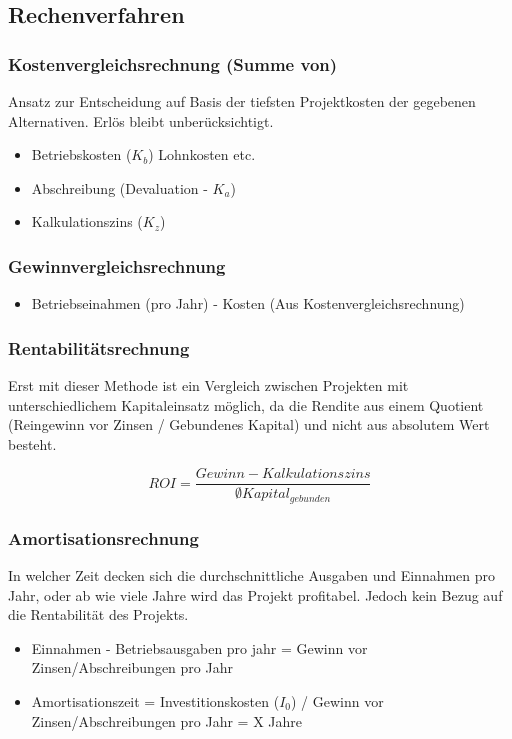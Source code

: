 \subsection{Rechenverfahren}
    \subsubsection{Kostenvergleichsrechnung (Summe von)}
    Ansatz zur Entscheidung auf Basis der tiefsten Projektkosten der gegebenen Alternativen. Erlös bleibt unberücksichtigt.
    \begin{itemize}
        \item Betriebskosten ($K_b$)
        \subitem Lohnkosten etc.
        \item Abschreibung (Devaluation - $K_a$) 
        \item Kalkulationszins ($K_z$)
    \end{itemize}
    \subsubsection{Gewinnvergleichsrechnung}
    \begin{itemize}
        \item Betriebseinahmen (pro Jahr) - Kosten (Aus Kostenvergleichsrechnung)
    \end{itemize}
    \subsubsection{Rentabilitätsrechnung}
    Erst mit dieser Methode ist ein Vergleich zwischen Projekten mit unterschiedlichem Kapitaleinsatz möglich, da die Rendite aus einem Quotient (Reingewinn vor Zinsen / Gebundenes Kapital) und nicht aus absolutem Wert besteht.
        
    \begin{equation}
        ROI = \frac{Gewinn - Kalkulationszins}{\emptyset Kapital_{gebunden}}
    \end{equation}
    \subsubsection{Amortisationsrechnung}
    In welcher Zeit decken sich die durchschnittliche Ausgaben und Einnahmen pro Jahr, oder ab wie viele Jahre wird das Projekt profitabel.
    Jedoch kein Bezug auf die Rentabilität des Projekts. 
    \begin{itemize}
        \item Einnahmen - Betriebsausgaben pro jahr = Gewinn vor Zinsen/Abschreibungen pro Jahr
        \item Amortisationszeit = Investitionskosten ($I_0$) / Gewinn vor Zinsen/Abschreibungen pro Jahr = X Jahre
    \end{itemize}

